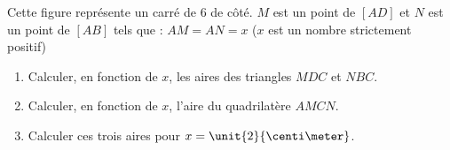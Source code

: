 
\begin{exercice}\label{exosmath-0809}

\begin{wrapfigure}[6]{r}{4.0cm}
   \vspace{-0.5cm}        %
   \centering
   
\end{wrapfigure}

    Cette figure représente un carré de \unit{6}{\centi\meter} de côté. $M$ est un point de $[AD]$ et $N$ est un point de $[AB]$ tels que : $AM = AN = x$ ($x$ est un nombre strictement positif) 

\begin{enumerate}
    \item
Calculer, en fonction de $x$, les aires des triangles $MDC$ et $NBC$. 
\item 
    Calculer, en fonction de $x$, l'aire du quadrilatère $AMCN$.
\item
 Calculer ces trois aires pour $x = \unit{2}{\centi\meter}$.
\end{enumerate}


\end{exercice}
